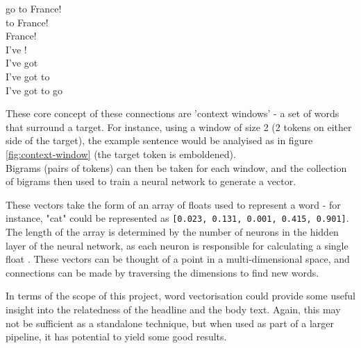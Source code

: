 \begin{minipage}{0.4\textwidth}
\begin{center}
 go to France!\\ \vspace{1mm}
 to France!\\ \vspace{1mm}
 France!\\ \vspace{1mm}
I've !\\ \vspace{1mm}
I've got \\ \vspace{1mm}
I've got to \\ \vspace{1mm}
I've got to go \\ 
\end{center}
\label{fig:context-window}

\end{minipage}
\begin{minipage}{0.5\textwidth}
These core concept of these connections are 'context windows' - a set of words that surround a target. For instance, using a window of size 2 (2 tokens on either side of the target), the example sentence would be analyised as in figure \ref{fig:context-window} (the target token is emboldened).\\
Bigrams (pairs of tokens) can then be taken for each window, and the collection of bigrams then used to train a neural network to generate a vector.
\end{minipage}

\vspace{2mm}

These vectors take the form of an array of floats used to represent a word - for instance, "cat" could be represented as \texttt{[0.023, 0.131, 0.001, 0.415, 0.901]}. The length of the array is determined by the number of neurons in the hidden layer of the neural network, as each neuron is responsible for calculating a single float \cite{bommana2019}. These vectors can be thought of a point in a multi-dimensional space, and connections can be made by traversing the dimensions to find new words.

In terms of the scope of this project, word vectorisation could provide some useful insight into the relatedness of the headline and the body text. Again, this may not be sufficient as a standalone technique, but when used as part of a larger pipeline, it has potential to yield some good results.

